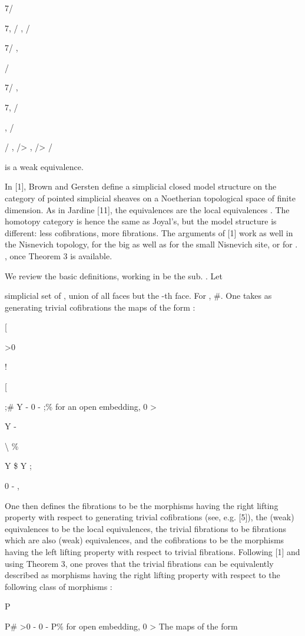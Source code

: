 \documentclass[11pt,a4paper]{article}
\theoremstyle{plain}
\theoremstyle{definition}
\begin{document}
7/

7, / 
, / 

7/
,

/ 

7/
, 

 

7, / 
 

, / 

/ , />   , />   /


is a weak equivalence.

In [1], Brown and Gersten define a simplicial closed model structure on the category of pointed simplicial sheaves on a Noetherian topological space of finite
dimension. As in Jardine [11], the equivalences are the local equivalences . The
homotopy category is hence the same as Joyal's, but the model structure is different:
less cofibrations, more fibrations.
The arguments of [1] work as well in the Nisnevich topology, for the big as well
as for the small Nisnevich site, or for
.   , once Theorem 3 is available.

We review the basic definitions, working in
be the sub.   . Let

simplicial set of
, union of all faces but the -th face. For
, 
\#. One
takes as generating trivial cofibrations the maps of the form
:

[ 

>0

!

[ 

;\#  Y  -  0  - 
;\%  for   an open embedding,
0  >

Y  - 

\textbackslash{} \%

Y
\$ Y
;

0  - 
,

One then defines the fibrations to be the morphisms
having the right lifting
property with respect to generating trivial cofibrations (see, e.g. [5]), the (weak)
equivalences to be the local equivalences, the trivial fibrations to be fibrations which
are also (weak) equivalences, and the cofibrations to be the morphisms having the
left lifting property with respect to trivial fibrations.
Following [1] and using Theorem 3, one proves that the trivial fibrations can be
equivalently described as morphisms having the right lifting property with respect
to the following class of morphisms
:

P

P\#  >0  -   0  - 
P\%  for   open embedding,
0  >
The maps of the form
\end{document}
